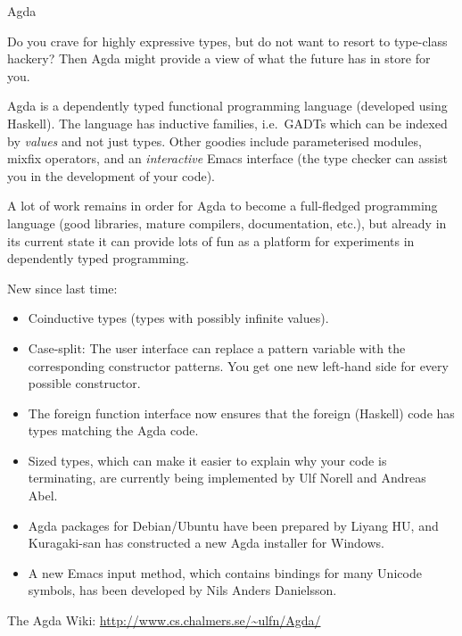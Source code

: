 \documentclass{article}
\begin{document}
\begin{hcarentry}[updated]{Agda}
\label{agda}
\makeheader

Do you crave for highly expressive types, but do not want to resort to
type-class hackery? Then Agda might provide a view of what the future
has in store for you.

Agda is a dependently typed functional programming language (developed
using Haskell). The language has inductive families, i.e.\ GADTs which
can be indexed by \emph{values} and not just types. Other goodies
include parameterised modules, mixfix operators, and an
\emph{interactive} Emacs interface (the type checker can assist you in
the development of your code).

A lot of work remains in order for Agda to become a full-fledged
programming language (good libraries, mature compilers, documentation,
etc.), but already in its current state it can provide lots of fun as
a platform for experiments in dependently typed programming.

New since last time:
\begin{itemize}
\item Coinductive types (types with possibly infinite values).
\item Case-split: The user interface can replace a pattern variable
  with the corresponding constructor patterns. You get one new
  left-hand side for every possible constructor.
\item The foreign function interface now ensures that the foreign
  (Haskell) code has types matching the Agda code.
\item Sized types, which can make it easier to explain why your code
  is terminating, are currently being implemented by Ulf Norell and
  Andreas Abel.
\item Agda packages for Debian/Ubuntu have been prepared by Liyang HU,
  and Kuragaki-san has constructed a new Agda installer for Windows.
\item A new Emacs input method, which contains bindings for many
  Unicode symbols, has been developed by Nils Anders Danielsson.
\end{itemize}

\FurtherReading
  The Agda Wiki: \url{http://www.cs.chalmers.se/~ulfn/Agda/}
\end{hcarentry}
\end{document}
